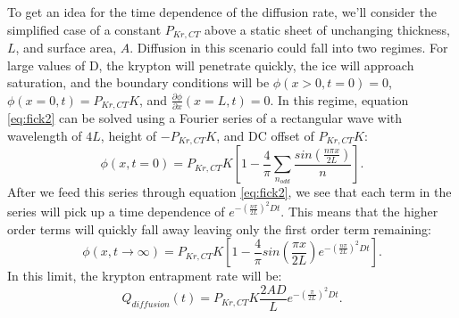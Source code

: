 To get an idea for the time dependence of the diffusion rate, we'll consider the simplified case of a constant $P_{Kr,CT}$ above a static sheet of unchanging thickness, $L$, and surface area, $A$. Diffusion in this scenario could fall into two regimes. For large values of D, the krypton will penetrate quickly, the ice will approach saturation, and the boundary conditions will be $\phi(x>0,t=0)=0$, $\phi(x=0,t)=P_{Kr,CT}K$, and $\frac{\partial \phi}{\partial x} (x=L,t)=0$. In this regime, equation \ref{eq:fick2} can be solved using a Fourier series of a rectangular wave with wavelength of $4L$, height of $-P_{Kr,CT}K$, and DC offset of $P_{Kr,CT}K$:
\begin{equation}
\phi(x,t=0)=P_{Kr,CT}K[1-\frac{4}{\pi}\sum_{n_{odd}}\frac{sin(\frac{n\pi x}{2L})}{n}].
\end{equation}
After we feed this series through equation \ref{eq:fick2}, we see that each term in the series will pick up a time dependence of $e^{-(\frac{n\pi }{2L})^2D t}$. This means that the higher order terms will quickly fall away leaving only the first order term remaining:
\begin{equation}
\phi(x,t \rightarrow \infty)=P_{Kr,CT}K[1-\frac{4}{\pi}sin(\frac{\pi x}{2L})e^{-(\frac{n\pi }{2L})^2D t}].
\end{equation}
In this limit, the krypton entrapment rate will be:
\begin{equation}
Q_{diffusion}(t)=P_{Kr,CT}K\frac{2AD}{L}e^{-(\frac{\pi }{2L})^2D t}.
\end{equation}

